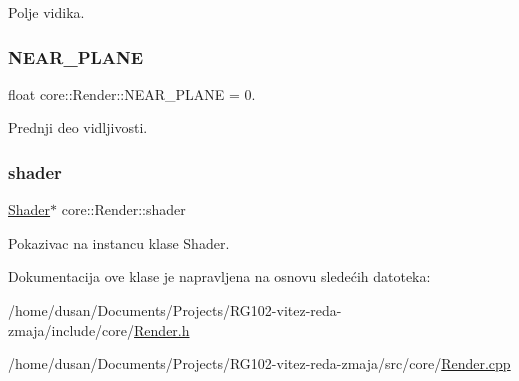 Polje vidika. 

\mbox{\label{classcore_1_1Render_a21b18ddc1ea04e877e9218e92cbb8a0a}} 
\subsubsection{\texorpdfstring{N\+E\+A\+R\+\_\+\+P\+L\+A\+NE}{NEAR\_PLANE}}
{\footnotesize\ttfamily float core\+::\+Render\+::\+N\+E\+A\+R\+\_\+\+P\+L\+A\+NE = 0.\hspace{0.3cm}{\ttfamily [private]}}



Prednji deo vidljivosti. 

\mbox{\label{classcore_1_1Render_a220be4bb26b6cbec909953f247a7732c}} 
\subsubsection{\texorpdfstring{shader}{shader}}
{\footnotesize\ttfamily \hyperlink{classshader_1_1Shader}{Shader}$\ast$ core\+::\+Render\+::shader\hspace{0.3cm}{\ttfamily [private]}}



Pokazivac na instancu klase Shader. 



Dokumentacija ove klase je napravljena na osnovu sledećih datoteka\+:\begin{DoxyCompactItemize}
\item 
/home/dusan/\+Documents/\+Projects/\+R\+G102-\/vitez-\/reda-\/zmaja/include/core/\hyperlink{Render_8h}{Render.\+h}\item 
/home/dusan/\+Documents/\+Projects/\+R\+G102-\/vitez-\/reda-\/zmaja/src/core/\hyperlink{Render_8cpp}{Render.\+cpp}\end{DoxyCompactItemize}
